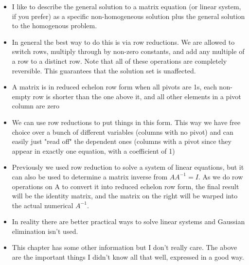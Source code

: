 \documentclass{article}
\begin{document}
\begin{itemize}
	\item I like to describe the general solution to a matrix equation (or linear system, if you prefer) as a specific non-homogeneous solution plus the general solution to the homogenous problem.
	
	\item In general the best way to do this is via row reductions. We are allowed to switch rows, multiply through by non-zero constants, and add any multiple of a row to a distinct row. Note that all of these operations are completely reversible. This guarantees that the solution set is unaffected.
	
	\item A matrix is in reduced echelon row form when all pivots are 1s, each non-empty row is shorter than the one above it, and all other elements in a pivot column are zero
	
	\item We can use row reductions to put things in this form. This way we have free choice over a bunch of different variables (columns with no pivot) and can easily just "read off" the dependent ones (columns with a pivot since they appear in exactly one equation, with a coefficient of 1)
	
	\item Previously we used row reduction to solve a system of linear equations, but it can also be used to determine a matrix inverse from $AA^{-1}=I$. As we do row operations on A to convert it into reduced echelon row form, the final result will be the identity matrix, and the matrix on the right will be warped into the actual numerical $A^{-1}$.
	
	\item In reality there are better practical ways to solve linear systems and Gaussian elimination isn't used.
	
	\item This chapter has some other information but I don't really care. The above are the important things I didn't know all that well, expressed in a good way.
	
\end{itemize}
\end{document}
